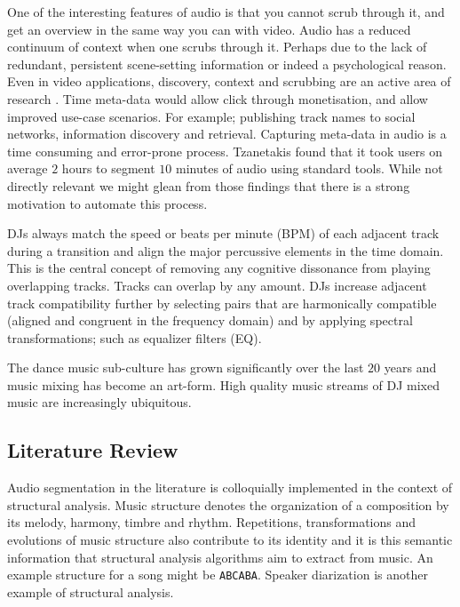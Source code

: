 \documentclass[twocolumn]{article}
\begin{document}
	One of the interesting features of audio is that you cannot scrub through it, and get an overview in the same way you can with video. Audio has a reduced continuum of context when one scrubs through it. Perhaps due to the lack of redundant, persistent scene-setting information or indeed a psychological reason. Even in video applications, discovery, context and scrubbing are an active area of research \cite{Matejka:2013:SIO:2470654.2466149}. Time meta-data would allow click through monetisation, and allow improved use-case scenarios. For example; publishing track names to social networks, information discovery and retrieval. Capturing meta-data in audio is a time consuming and error-prone process. Tzanetakis \cite{tzanetakis1999framework} found that it took users on average $2$ hours to segment $10$ minutes of audio using standard tools. While not directly relevant we might glean from those findings that there is a strong motivation to automate this process.
	
	DJs always match the speed or beats per minute (BPM) of each adjacent track during a transition and align the major percussive elements in the time domain. This is the central concept of removing any cognitive dissonance from playing overlapping tracks. Tracks can overlap by any amount. DJs increase adjacent track compatibility further by selecting pairs that are harmonically compatible (aligned and congruent in the frequency domain) and by applying spectral transformations; such as equalizer filters (EQ).
	
	The dance music sub-culture has grown significantly over the last $20$ years and music mixing has become an art-form. High quality music streams of DJ mixed music are increasingly ubiquitous. 
	
	\subsection{Literature Review}
	
	Audio segmentation in the literature is colloquially implemented in the context of structural analysis. Music structure denotes the organization of a composition by its melody, harmony, timbre and rhythm. Repetitions, transformations and evolutions of music structure also contribute to its identity and it is this semantic information that structural analysis algorithms aim to extract from music. An example structure for a song might be \texttt{ABCABA}. Speaker diarization is another example of structural analysis.
	
\end{document}
